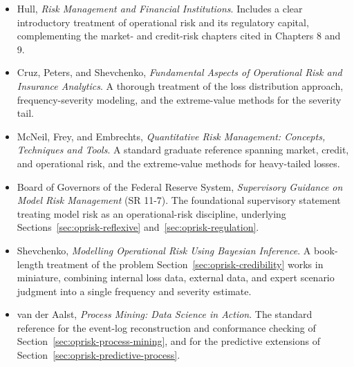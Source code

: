\documentclass[../ai_in_finance]{subfiles}
\begin{document}
\begin{itemize}
\item Hull, \emph{Risk Management and Financial Institutions}. Includes a clear introductory treatment of operational risk and its regulatory capital, complementing the market- and credit-risk chapters cited in Chapters 8 and 9.
\item Cruz, Peters, and Shevchenko, \emph{Fundamental Aspects of Operational Risk and Insurance Analytics}. A thorough treatment of the loss distribution approach, frequency-severity modeling, and the extreme-value methods for the severity tail.
\item McNeil, Frey, and Embrechts, \emph{Quantitative Risk Management: Concepts, Techniques and Tools}. A standard graduate reference spanning market, credit, and operational risk, and the extreme-value methods for heavy-tailed losses.
\item Board of Governors of the Federal Reserve System, \emph{Supervisory Guidance on Model Risk Management} (SR 11-7). The foundational supervisory statement treating model risk as an operational-risk discipline, underlying Sections~\ref{sec:oprisk-reflexive} and~\ref{sec:oprisk-regulation}.
\item Shevchenko, \emph{Modelling Operational Risk Using Bayesian Inference}. A book-length treatment of the problem Section~\ref{sec:oprisk-credibility} works in miniature, combining internal loss data, external data, and expert scenario judgment into a single frequency and severity estimate.
\item van der Aalst, \emph{Process Mining: Data Science in Action}. The standard reference for the event-log reconstruction and conformance checking of Section~\ref{sec:oprisk-process-mining}, and for the predictive extensions of Section~\ref{sec:oprisk-predictive-process}.
\end{itemize}
\end{document}
